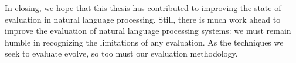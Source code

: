 In closing, we hope that this thesis has contributed to improving the state of evaluation in natural language processing.
Still, there is much work ahead to improve the evaluation of natural language processing systems:
  we must remain humble in recognizing the limitations of any evaluation.
As the techniques we seek to evaluate evolve, so too must our evaluation methodology.
